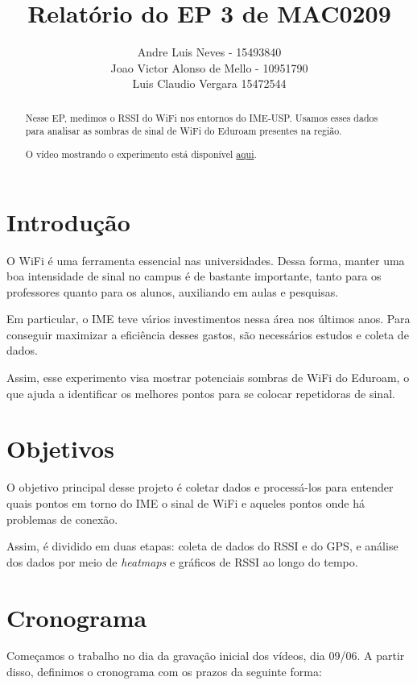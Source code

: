 \documentclass{article}
\title{Relatório do EP 3 de MAC0209}
\author{Andre Luis Neves - 15493840 \\ Joao Victor Alonso de Mello - 10951790 \\ Luis Claudio Vergara 15472544}
\begin{document}
\maketitle


\begin{abstract}
  Nesse EP, medimos o RSSI do WiFi nos entornos do IME-USP. Usamos esses dados para analisar as sombras de sinal de WiFi do Eduroam presentes na região.
  
  O vídeo mostrando o experimento está disponível \href{https://youtube.com}{aqui}.

\end{abstract}

\newpage

\tableofcontents

\newpage

\section{Introdução}
O WiFi é uma ferramenta essencial nas universidades. Dessa forma, manter uma boa intensidade de sinal no campus é de bastante importante, tanto para os professores quanto para os alunos, auxiliando em aulas e pesquisas.

Em particular, o IME teve vários investimentos nessa área nos últimos anos. Para conseguir maximizar a eficiência desses gastos, são necessários estudos e coleta de dados.

Assim, esse experimento visa mostrar potenciais sombras de WiFi do Eduroam, o que ajuda a identificar os melhores pontos para se colocar repetidoras de sinal.

\section{Objetivos}
O objetivo principal desse projeto é coletar dados e processá-los para entender quais pontos em torno do IME o sinal de WiFi e aqueles pontos onde há problemas de conexão.

Assim, é dividido em duas etapas: coleta de dados do RSSI e do GPS, e análise dos dados por meio de \textit{heatmaps} e gráficos de RSSI ao longo do tempo.

\section{Cronograma}

Começamos o trabalho no dia da gravação inicial dos vídeos, dia 09/06. A partir disso, definimos o cronograma com os prazos da seguinte forma:
\end{document}

